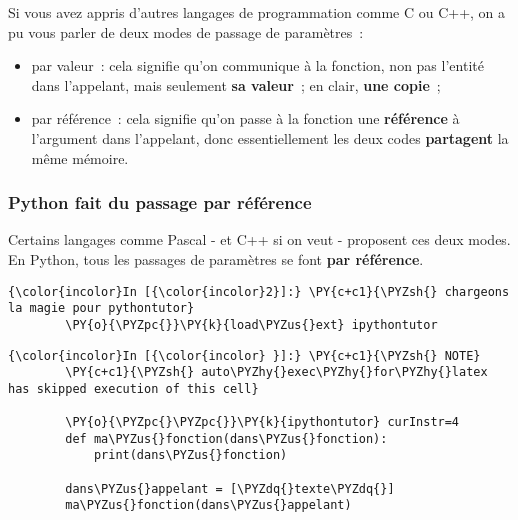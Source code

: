     Si vous avez appris d'autres langages de programmation comme C ou C++,
on a pu vous parler de deux modes de passage de paramètres~:

\begin{itemize}
\tightlist
\item
  par valeur~: cela signifie qu'on communique à la fonction, non pas
  l'entité dans l'appelant, mais seulement \textbf{sa valeur}~; en
  clair, \textbf{une copie}~;
\item
  par référence~: cela signifie qu'on passe à la fonction une
  \textbf{référence} à l'argument dans l'appelant, donc essentiellement
  les deux codes \textbf{partagent} la même mémoire.
\end{itemize}

    \hypertarget{python-fait-du-passage-par-ruxe9fuxe9rence}{%
\subsubsection{Python fait du passage par
référence}\label{python-fait-du-passage-par-ruxe9fuxe9rence}}

    Certains langages comme Pascal - et C++ si on veut - proposent ces deux
modes. En Python, tous les passages de paramètres se font \textbf{par
référence}.

    \begin{Verbatim}[commandchars=\\\{\},frame=single,framerule=0.3mm,rulecolor=\color{cellframecolor}]
{\color{incolor}In [{\color{incolor}2}]:} \PY{c+c1}{\PYZsh{} chargeons la magie pour pythontutor}
        \PY{o}{\PYZpc{}}\PY{k}{load\PYZus{}ext} ipythontutor
\end{Verbatim}


    \begin{Verbatim}[commandchars=\\\{\},frame=single,framerule=0.3mm,rulecolor=\color{cellframecolor}]
{\color{incolor}In [{\color{incolor} }]:} \PY{c+c1}{\PYZsh{} NOTE}
        \PY{c+c1}{\PYZsh{} auto\PYZhy{}exec\PYZhy{}for\PYZhy{}latex has skipped execution of this cell}
        
        \PY{o}{\PYZpc{}\PYZpc{}}\PY{k}{ipythontutor} curInstr=4
        def ma\PYZus{}fonction(dans\PYZus{}fonction):
            print(dans\PYZus{}fonction)
            
        dans\PYZus{}appelant = [\PYZdq{}texte\PYZdq{}]
        ma\PYZus{}fonction(dans\PYZus{}appelant)
\end{Verbatim}


